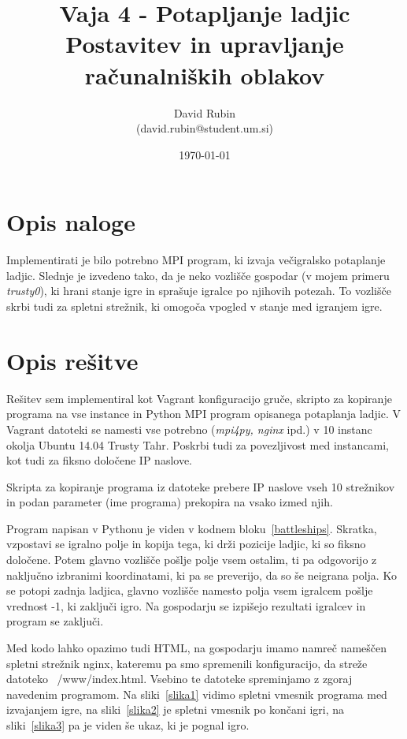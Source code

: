 \documentclass[a4paper,11pt]{article}
\title{%
  Vaja 4 - Potapljanje ladjic\\
  \large Postavitev in upravljanje računalniških oblakov}
\author{David Rubin \\ (david.rubin@student.um.si)}
\date{\today}
\begin{document}
\maketitle

\section{Opis naloge}

Implementirati je bilo potrebno MPI program, ki izvaja večigralsko potaplanje ladjic. Slednje je izvedeno tako, da je neko vozlišče gospodar (v mojem primeru \textit{trusty0}), ki hrani stanje igre in sprašuje igralce po njihovih potezah. To vozlišče skrbi tudi za spletni strežnik, ki omogoča vpogled v stanje med igranjem igre.

\section{Opis rešitve}

Rešitev sem implementiral kot Vagrant konfiguracijo gruče, skripto za kopiranje programa na vse instance in Python MPI program opisanega potaplanja ladjic. V Vagrant datoteki se namesti vse potrebno (\textit{mpi4py, nginx} ipd.) v 10 instanc okolja Ubuntu 14.04 Trusty Tahr. Poskrbi tudi za povezljivost med instancami, kot tudi za fiksno določene IP naslove.

Skripta za kopiranje programa iz datoteke prebere IP naslove vseh 10 strežnikov in podan parameter (ime programa) prekopira na vsako izmed njih.

Program napisan v Pythonu je viden v kodnem bloku~\ref{battleships}. Skratka, vzpostavi se igralno polje in kopija tega, ki drži pozicije ladjic, ki so fiksno določene. Potem glavno vozlišče pošlje polje vsem ostalim, ti pa odgovorijo z naključno izbranimi koordinatami, ki pa se preverijo, da so še neigrana polja. Ko se potopi zadnja ladjica, glavno vozlišče namesto polja vsem igralcem pošlje vrednost -1, ki zaključi igro. Na gospodarju se izpišejo rezultati igralcev in program se zaključi.



Med kodo lahko opazimo tudi HTML, na gospodarju imamo namreč nameščen spletni strežnik nginx, kateremu pa smo spremenili konfiguracijo, da streže datoteko ~/www/index.html. Vsebino te datoteke spreminjamo z zgoraj navedenim programom. Na sliki~\ref{slika1} vidimo spletni vmesnik programa med izvajanjem igre, na sliki~\ref{slika2} je spletni vmesnik po končani igri, na sliki~\ref{slika3} pa je viden še ukaz, ki je pognal igro.
\end{document}
